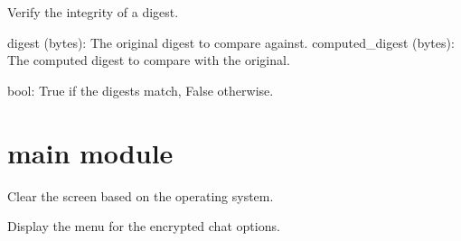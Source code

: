 \documentclass[letterpaper,10pt,english]{sphinxmanual}
\begin{document}

\begin{fulllineitems}
\label{\detokenize{integrity:integrity.verify_digest}}
\pysigstartsignatures
{}
\pysigstopsignatures
\sphinxAtStartPar
Verify the integrity of a digest.
\begin{description}
\sphinxAtStartPar
digest (bytes): The original digest to compare against.
computed\_digest (bytes): The computed digest to compare with the original.

\sphinxAtStartPar
bool: True if the digests match, False otherwise.

\end{description}

\end{fulllineitems}


\sphinxstepscope


\section{main module}
\label{\detokenize{main:module-main}}\label{\detokenize{main:main-module}}\label{\detokenize{main::doc}}

\begin{fulllineitems}
\label{\detokenize{main:main.clear_screen}}
\pysigstartsignatures
{}
\pysigstopsignatures
\sphinxAtStartPar
Clear the screen based on the operating system.

\end{fulllineitems}


\begin{fulllineitems}
\label{\detokenize{main:main.encrypted_chat_menu}}
\pysigstartsignatures
{}
\pysigstopsignatures
\sphinxAtStartPar
Display the menu for the encrypted chat options.

\end{fulllineitems}
\end{document}
